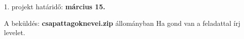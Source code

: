 1. projekt határidő: {\bf március 15.}\newline



A beküldés: {\bf csapattagoknevei.zip} állományban\newline
Ha gond van a feladattal írj levelet.


